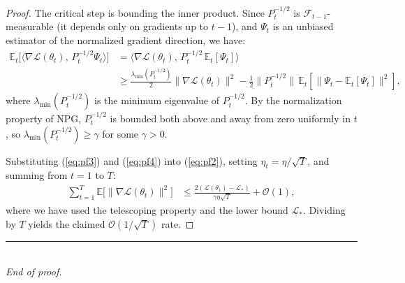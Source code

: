 \documentclass[11pt,twoside,openright]{book}
\begin{document}
\begin{proof}
The critical step is bounding the inner product. Since $P_t^{-1/2}$ is $\mathcal{F}_{t-1}$-measurable
(it depends only on gradients up to $t-1$), and $\Psi_t$ is an unbiased estimator of the
normalized gradient direction, we have:
\begin{align}
  \mathbb{E}_t\bigl[\langle\nabla\mathcal{L}(\theta_t),\, P_t^{-1/2}\Psi_t\rangle\bigr]
    &= \langle\nabla\mathcal{L}(\theta_t),\,
        P_t^{-1/2}\,\mathbb{E}_t[\Psi_t]\rangle \nonumber\\
    &\geq \frac{\lambda_{\min}(P_t^{-1/2})}{2}\|\nabla\mathcal{L}(\theta_t)\|^2
        - \frac{1}{2}\|P_t^{-1/2}\|\,\mathbb{E}_t[\|\Psi_t - \mathbb{E}_t[\Psi_t]\|^2],
  \label{eq:pf4}
\end{align}
where $\lambda_{\min}(P_t^{-1/2})$ is the minimum eigenvalue of $P_t^{-1/2}$. By the
normalization property of NPG, $P_t^{-1/2}$ is bounded both above and away from zero
uniformly in $t$, so $\lambda_{\min}(P_t^{-1/2}) \geq \gamma$ for some $\gamma > 0$.

Substituting (\ref{eq:pf3}) and (\ref{eq:pf4}) into (\ref{eq:pf2}), setting $\eta_t =
\eta/\sqrt{T}$, and summing from $t=1$ to $T$:
\begin{align}
  \sum_{t=1}^{T} \mathbb{E}\bigl[\|\nabla\mathcal{L}(\theta_t)\|^2\bigr]
    &\leq \frac{2(\mathcal{L}(\theta_1) - \mathcal{L}_*)}{\gamma\eta\sqrt{T}}
        + \mathcal{O}(1),
\end{align}
where we have used the telescoping property and the lower bound $\mathcal{L}_*$. Dividing by
$T$ yields the claimed $\mathcal{O}(1/\sqrt{T})$ rate.
\end{proof}

\null\vfill
\begin{center}
\rule{0.3\textwidth}{0.4pt}\\[8pt]
{\small\textit{End of proof.}}
\end{center}


\end{document}
